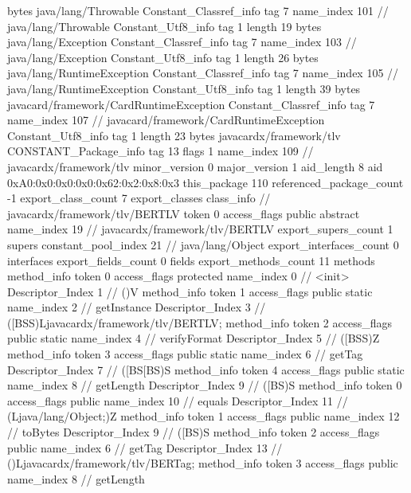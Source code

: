 {{{			bytes	java/lang/Throwable
		}
		Constant_Classref_info {
			tag	7
			name_index	101		// java/lang/Throwable
		}
		Constant_Utf8_info {
			tag	1
			length	19
			bytes	java/lang/Exception
		}
		Constant_Classref_info {
			tag	7
			name_index	103		// java/lang/Exception
		}
		Constant_Utf8_info {
			tag	1
			length	26
			bytes	java/lang/RuntimeException
		}
		Constant_Classref_info {
			tag	7
			name_index	105		// java/lang/RuntimeException
		}
		Constant_Utf8_info {
			tag	1
			length	39
			bytes	javacard/framework/CardRuntimeException
		}
		Constant_Classref_info {
			tag	7
			name_index	107		// javacard/framework/CardRuntimeException
		}
		Constant_Utf8_info {
			tag	1
			length	23
			bytes	javacardx/framework/tlv
		}
		CONSTANT_Package_info {
			tag	13
			flags	1
			name_index	109		// javacardx/framework/tlv
			minor_version	0
			major_version	1
			aid_length	8
			aid	0xA0:0x0:0x0:0x0:0x62:0x2:0x8:0x3
		}
	}
	this_package	110
	referenced_package_count	-1
	export_class_count	7
	export_classes {
		class_info {		// javacardx/framework/tlv/BERTLV
			token	0
			access_flags	public abstract
			name_index	19		// javacardx/framework/tlv/BERTLV
			export_supers_count	1
			supers {
				constant_pool_index	21		// java/lang/Object
			}
			export_interfaces_count	0
			interfaces {
			}
			export_fields_count	0
			fields {
			}
			export_methods_count	11
			methods {
				method_info {
					token	0
					access_flags	protected
					name_index	0		// <init>
					Descriptor_Index	1		// ()V
				}
				method_info {
					token	1
					access_flags	public static
					name_index	2		// getInstance
					Descriptor_Index	3		// ([BSS)Ljavacardx/framework/tlv/BERTLV;
				}
				method_info {
					token	2
					access_flags	public static
					name_index	4		// verifyFormat
					Descriptor_Index	5		// ([BSS)Z
				}
				method_info {
					token	3
					access_flags	public static
					name_index	6		// getTag
					Descriptor_Index	7		// ([BS[BS)S
				}
				method_info {
					token	4
					access_flags	public static
					name_index	8		// getLength
					Descriptor_Index	9		// ([BS)S
				}
				method_info {
					token	0
					access_flags	public
					name_index	10		// equals
					Descriptor_Index	11		// (Ljava/lang/Object;)Z
				}
				method_info {
					token	1
					access_flags	public
					name_index	12		// toBytes
					Descriptor_Index	9		// ([BS)S
				}
				method_info {
					token	2
					access_flags	public
					name_index	6		// getTag
					Descriptor_Index	13		// ()Ljavacardx/framework/tlv/BERTag;
				}
				method_info {
					token	3
					access_flags	public
					name_index	8		// getLength
}}}}}
